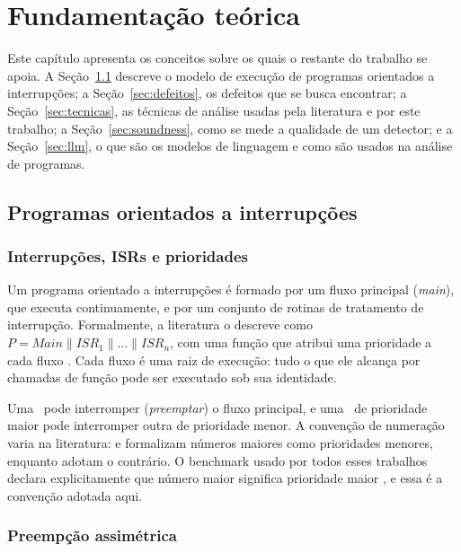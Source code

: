 \chapter{Fundamentação teórica}
\label{cap:fundamentacao}

Este capítulo apresenta os conceitos sobre os quais o restante do trabalho se
apoia. A Seção~\ref{sec:interrupcoes} descreve o modelo de execução de
programas orientados a interrupções; a Seção~\ref{sec:defeitos}, os defeitos
que se busca encontrar; a Seção~\ref{sec:tecnicas}, as técnicas de análise
usadas pela literatura e por este trabalho; a Seção~\ref{sec:soundness}, como
se mede a qualidade de um detector; e a Seção~\ref{sec:llm}, o que são os
modelos de linguagem e como são usados na análise de programas.

\section{Programas orientados a interrupções}
\label{sec:interrupcoes}


\subsection{Interrupções, ISRs e prioridades}

Um programa orientado a interrupções é formado por um fluxo principal
(\textit{main}), que executa continuamente, e por um conjunto de rotinas de
tratamento de interrupção. Formalmente, a literatura o descreve como
$P = \mathit{Main} \parallel \mathit{ISR}_1 \parallel \dots \parallel
\mathit{ISR}_n$, com uma função que atribui uma prioridade a cada fluxo
\cite{bmc4av}. Cada fluxo é uma raiz de execução: tudo o que ele alcança por
chamadas de função pode ser executado sob sua identidade.

Uma \isr\ pode interromper (\textit{preemptar}) o fluxo principal, e uma \isr\
de prioridade maior pode interromper outra de prioridade menor. A convenção de
numeração varia na literatura: \citeonline{sdracer} e \citeonline{intrace}
formalizam números maiores como prioridades menores, enquanto
 adotam o contrário. O benchmark usado por todos esses
trabalhos declara explicitamente que número maior significa prioridade
maior \cite{racebench}, e essa é a convenção adotada aqui.

\subsection{Preempção assimétrica}

